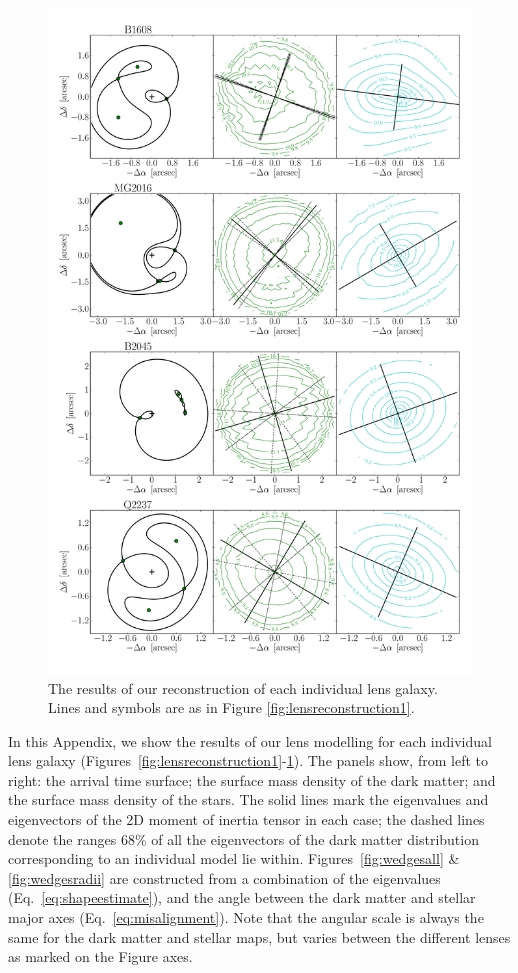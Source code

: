 \documentclass[useAMS,usenatbib]{mn2e}
\begin{document}
\begin{figure}
  \centering
  \includegraphics[width=.83\linewidth]{Figures/AllLenses33.pdf}
  \caption[width=.65\linewidth]{The results of our reconstruction of each individual lens galaxy. Lines and symbols are as in Figure \ref{fig:lensreconstruction1}.}
  \label{fig:lensreconstruction3}
\end{figure}

In this Appendix, we show the results of our lens modelling for each individual lens galaxy (Figures~\ref{fig:lensreconstruction1}-\ref{fig:lensreconstruction3}). The panels show, from left to right: the arrival time surface; the surface mass density of the dark matter; and the surface mass density of the stars. The solid lines mark the eigenvalues and eigenvectors of the 2D moment of inertia tensor in each case; the dashed lines denote the ranges 68\% of all the eigenvectors of the dark matter distribution corresponding to an individual model lie within. Figures~\ref{fig:wedgesall} \& \ref{fig:wedgesradii} are constructed from a combination of the eigenvalues (Eq.~\ref{eq:shapeestimate}), and the angle between the dark matter and stellar major axes (Eq.~\ref{eq:misalignment}). Note that the angular scale is always the same for the dark matter and stellar maps, but varies between the different lenses as marked on the Figure axes.
\end{document}
